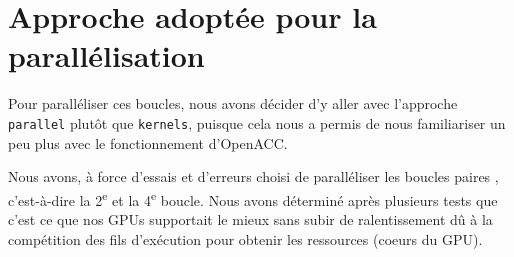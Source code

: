 \documentclass[11pt]{report}
\begin{document}
	\section{Approche adoptée pour la parallélisation }
		Pour paralléliser ces boucles, nous avons décider d'y aller avec l'approche \texttt{parallel} plutôt que \texttt{kernels}, puisque cela nous a permis de nous familiariser un peu plus avec le fonctionnement d'OpenACC.
		
		\bigskip
		Nous avons, à force d'essais et d'erreurs choisi de paralléliser les boucles \og paires \fg{}, c'est-à-dire la 2\textsuperscript{e} et la 4\textsuperscript{e} boucle. Nous avons déterminé après plusieurs tests que c'est ce que nos GPUs supportait le mieux sans subir de ralentissement dû à la compétition des fils d'exécution pour obtenir les ressources (coeurs du GPU).
\end{document}
